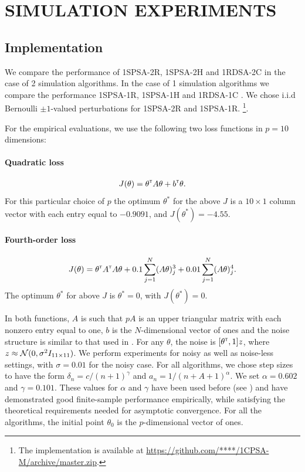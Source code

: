 \section{SIMULATION EXPERIMENTS}
\label{sec:expts}
\subsection{Implementation}
We compare the performance of 1SPSA-2R, 1SPSA-2H and 1RDSA-2C in the case of 
2 simulation algorithms. In the case of 1 simulation algorithms we compare the 
performance 1SPSA-1R, 1SPSA-1H and 1RDSA-1C . 
We chose i.i.d Bernoulli $\pm 1$-valued perturbations for 1SPSA-2R and 1SPSA-1R.
\footnote{The implementation is available at 
\url{https://github.com/****/1CPSA-M/archive/master.zip}.}.

For the empirical evaluations, 
we use the following two loss functions in $p=10$ dimensions:
\paragraph{Quadratic loss}
\begin{align}
J(\theta) = \theta^\mathsf{\scriptscriptstyle T} A \theta + b^\mathsf{\scriptscriptstyle T} \theta. \label{eq:quadratic}
\end{align} 
For this particular choice of $p$ the optimum $\theta^*$ for the above $J$ is 
a $10 \times 1$ column vector with each entry equal to 
$-0.9091$, and $J(\theta^*) = -4.55$.

\paragraph{Fourth-order loss}
\begin{align} 
J(\theta) = \theta ^\mathsf{\scriptscriptstyle T} A^\mathsf{\scriptscriptstyle T} A\theta+0.1 \sum_{j=1}^N (A\theta)^3_j+0.01 \sum_{j=1}^N (A\theta)^4_j.\label{eq:4thorder}
 \end{align} 
The optimum $\theta^*$ for above $J$ is $\theta^*=0$, with $J(\theta^*) = 0$. 

In both functions, $A$ is such that $pA$ is an upper triangular matrix with each 
nonzero entry equal to one, $b$ is the $N$-dimensional vector of ones and 
the noise structure is similar to that used in \cite{spall_adaptive}. 
For any $\theta$, the noise is $[\theta^\mathsf{\scriptscriptstyle T}, 1]z$, where $z \approx \mathcal{N}(0,\sigma^2 I_{11\times11})$.
We perform experiments for noisy as well as noise-less settings, with $\sigma=0.01$ for
the noisy case. 
For all algorithms, we chose step sizes to have the form 
$\delta_n = c/(n+1)^{\gamma}$ and $a_n = 1/(n+A+1)^{\alpha}$.
We set $\alpha=0.602$ and $\gamma=0.101$.
These values for $\alpha$ and $\gamma$ have been used  before (see 
\cite{spall_adaptive}) and have demonstrated good finite-sample performance 
empirically, while satisfying the theoretical requirements needed for asymptotic 
convergence.  For all the algorithms, the initial point $\theta_0$ is the 
$p$-dimensional vector of ones.
